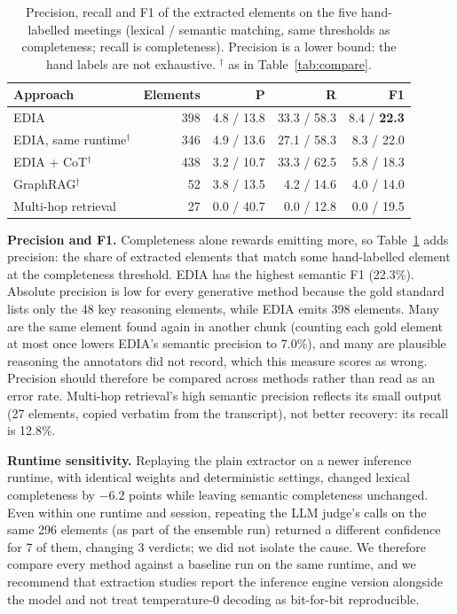 \documentclass[conference]{IEEEtran}
\begin{document}
\begin{table}[t]
\caption{Precision, recall and F1 of the extracted elements on the five
hand-labelled meetings (lexical / semantic matching, same thresholds as
completeness; recall is completeness). Precision is a lower bound: the hand labels
are not exhaustive. $^\dagger$ as in Table~\ref{tab:compare}.}
\label{tab:prf}
\centering
\small
\begin{tabular}{@{}lrrrr@{}}
\toprule
Approach & Elements & P & R & F1 \\
\midrule
EDIA & 398 & 4.8 / 13.8 & 33.3 / 58.3 & 8.4 / \textbf{22.3} \\
EDIA, same runtime$^\dagger$ & 346 & 4.9 / 13.6 & 27.1 / 58.3 & 8.3 / 22.0 \\
EDIA + CoT$^\dagger$ & 438 & 3.2 / 10.7 & 33.3 / 62.5 & 5.8 / 18.3 \\
GraphRAG$^\dagger$ & 52 & 3.8 / 13.5 & 4.2 / 14.6 & 4.0 / 14.0 \\
Multi-hop retrieval & 27 & 0.0 / 40.7 & 0.0 / 12.8 & 0.0 / 19.5 \\
\bottomrule
\end{tabular}
\end{table}

\textbf{Precision and F1.} Completeness alone rewards emitting more, so
Table~\ref{tab:prf} adds precision: the share of extracted elements that match
some hand-labelled element at the completeness threshold. EDIA has the highest
semantic F1 (22.3\%). Absolute precision is low for every generative method
because the gold standard lists only the 48 key reasoning elements, while EDIA
emits 398 elements. Many are the same element found again in another chunk
(counting each gold element at most once lowers EDIA's semantic precision to
7.0\%), and many are plausible reasoning the annotators did not record, which
this measure scores as wrong. Precision should therefore be compared across
methods rather than read as an error rate. Multi-hop retrieval's high semantic
precision reflects its small output (27 elements, copied verbatim from the
transcript), not better recovery: its recall is 12.8\%.

\textbf{Runtime sensitivity.} Replaying the plain extractor on a newer inference
runtime, with identical weights and deterministic settings, changed lexical
completeness by $-6.2$ points while leaving semantic completeness unchanged.
Even within one runtime and session, repeating the LLM judge's calls on the
same 296 elements (as part of the ensemble run) returned a different confidence
for 7 of them, changing 3 verdicts; we did not isolate the cause. We therefore
compare every method against a baseline run on the same runtime, and we
recommend that extraction studies report the inference engine version alongside
the model and not treat temperature-0 decoding as bit-for-bit reproducible.
\end{document}
